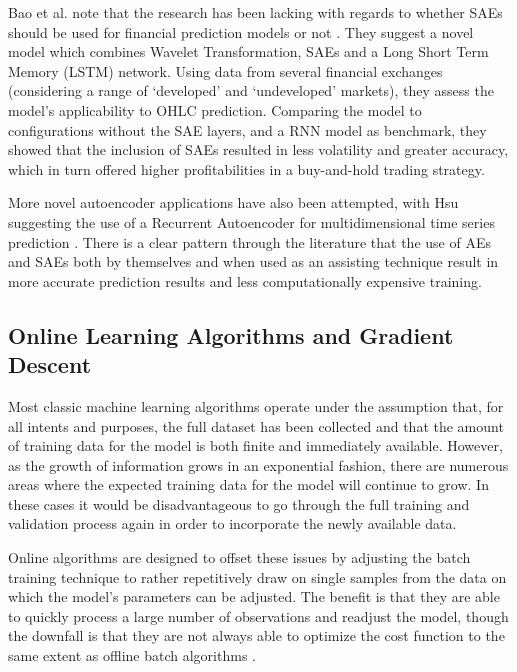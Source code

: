 \documentclass[a4paper,11pt,oneside]{article}
\theoremstyle{plain}
\theoremstyle{definition}
\begin{document}
Bao et al.  note that the research has been lacking with regards to whether SAEs should be used for 
financial prediction models or not \cite{Bao}. They suggest a novel model which combines Wavelet Transformation, SAEs 
and a Long Short Term Memory (LSTM) network. Using data from several financial exchanges (considering a 
range of ‘developed’ and ‘undeveloped’ markets), they assess the model’s applicability to OHLC prediction. 
Comparing the model to configurations without the SAE layers, and a RNN model as benchmark, they showed 
that the inclusion of SAEs resulted in less volatility and greater accuracy, which in turn offered higher profitabilities 
in a buy-and-hold trading strategy.
\hfill \break 

More novel autoencoder applications have also been attempted, with Hsu suggesting the use of a 
Recurrent Autoencoder for multidimensional time series prediction \cite{Hsu}. There is a clear pattern through the literature 
that the use of AEs and SAEs both by themselves and when used as an assisting technique result in more accurate 
prediction results and less computationally expensive training.

\subsection{Online Learning Algorithms and Gradient Descent} \label{lr_OGD}
\hfill

Most classic machine learning algorithms operate under the assumption that, for all intents and purposes, the 
full dataset has been collected and that the amount of training data for the model is both finite and immediately 
available. However, as the growth of information grows in an exponential fashion, there are numerous areas where
 the expected training data for the model will continue to grow. In these cases it would be disadvantageous to go 
 through the full training and validation process again in order to incorporate the newly available data.
\hfill\break

Online algorithms are designed to offset these issues by adjusting the batch training technique to rather 
repetitively draw on single samples from the data on which the model’s parameters can be adjusted. The benefit 
is that they are able to quickly process a large number of observations and readjust the model, though the 
downfall is that they are not always able to optimize the cost function to the same extent as offline batch 
algorithms \cite{Albers}.
\hfill\break
\end{document}
